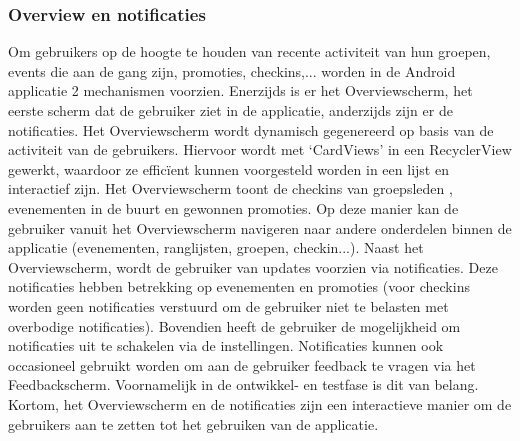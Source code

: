\subsubsection{Overview en notificaties} %
Om gebruikers op de hoogte te houden van recente activiteit van hun groepen, events die aan de gang zijn, promoties, checkins,... worden in de Android applicatie 2 mechanismen voorzien. 
Enerzijds is er het Overviewscherm, het eerste scherm dat de gebruiker ziet in de applicatie, anderzijds zijn er de notificaties.
Het Overviewscherm wordt dynamisch gegenereerd op basis van de activiteit van de gebruikers. Hiervoor wordt met `CardViews' in een RecyclerView gewerkt, waardoor ze efficïent kunnen voorgesteld worden in een lijst en interactief zijn. Het Overviewscherm toont de checkins van groepsleden , evenementen in de buurt en gewonnen promoties. Op deze manier kan de gebruiker vanuit het Overviewscherm navigeren naar andere onderdelen binnen de applicatie (evenementen, ranglijsten, groepen, checkin...).
Naast het Overviewscherm, wordt de gebruiker van updates voorzien via notificaties. Deze notificaties hebben betrekking op evenementen en promoties (voor checkins worden geen notificaties verstuurd om de gebruiker niet te belasten met overbodige notificaties). Bovendien heeft de gebruiker de mogelijkheid om notificaties uit te schakelen via de instellingen. Notificaties kunnen ook occasioneel gebruikt worden om aan de gebruiker feedback te vragen via het Feedbackscherm. Voornamelijk in de ontwikkel- en testfase is dit van belang.
Kortom, het Overviewscherm en de notificaties zijn een interactieve manier om de gebruikers aan te zetten tot het gebruiken van de applicatie.

